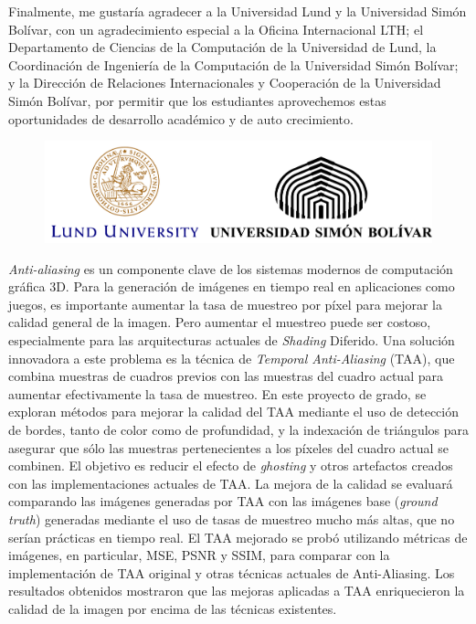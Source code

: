 \documentclass[pregrado]{tesis-usb} %
\begin{document}
Finalmente, me gustaría agradecer a la Universidad Lund y la Universidad Simón Bolívar, con un agradecimiento especial a la Oficina Internacional LTH; el Departamento de Ciencias de la Computación de la Universidad de Lund, la Coordinación de Ingeniería de la Computación de la Universidad Simón Bolívar; y la Dirección de Relaciones Internacionales y Cooperación de la Universidad Simón Bolívar, por permitir que los estudiantes aprovechemos estas oportunidades de desarrollo académico y de auto crecimiento.

\begin{figure}[!hbt]
	\centering
	\includegraphics[scale=0.3]{images/univ_logotypes.png}
\end{figure}

\begin{resumen}
	\textit{Anti-aliasing} es un componente clave de los sistemas modernos de computación gráfica 3D. Para la generación de imágenes en tiempo real en aplicaciones como juegos, es importante aumentar la tasa de muestreo por píxel para mejorar la calidad general de la imagen. Pero aumentar el muestreo puede ser costoso, especialmente para las arquitecturas actuales de \textit{Shading} Diferido. Una solución innovadora a este problema es la técnica de \textit{Temporal Anti-Aliasing} (TAA), que combina muestras de cuadros previos con las muestras del cuadro actual para aumentar efectivamente la tasa de muestreo. En este proyecto de grado, se exploran métodos para mejorar la calidad del TAA mediante el uso de detección de bordes, tanto de color como de profundidad, y la indexación de triángulos para asegurar que sólo las muestras pertenecientes a los píxeles del cuadro actual se combinen. El objetivo es reducir el efecto de \textit{ghosting} y otros artefactos creados con las implementaciones actuales de TAA. La mejora de la calidad se evaluará comparando las imágenes generadas por TAA con las imágenes base (\textit{ground truth}) generadas mediante el uso de tasas de muestreo mucho más altas, que no serían prácticas en tiempo real. El TAA mejorado se probó utilizando métricas de imágenes, en particular, MSE, PSNR y SSIM, para comparar con la implementación de TAA original y otras técnicas actuales de Anti-Aliasing. Los resultados obtenidos mostraron que las mejoras aplicadas a TAA enriquecieron la calidad de la imagen por encima de las técnicas existentes. \\
	\vspace{2cm}\par{}
\end{resumen}
\end{document}
